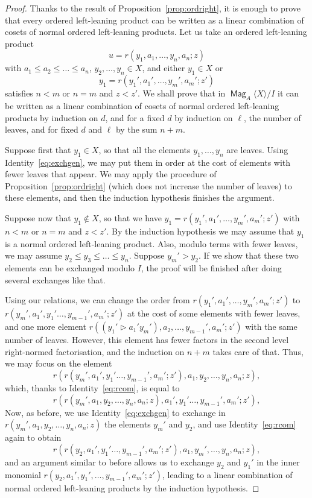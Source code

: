 \documentclass[10pt,a4paper]{article}
\theoremstyle{definition}
\numberwithin{equation}{section}
\numberwithin{figure}{section}
\DeclareMathOperator{\Mag}{\mathsf{Mag}}
\begin{document}
\begin{proof}
Thanks to the result of Proposition~\ref{prop:ordright}, it is enough to prove that every ordered left-leaning product can be written as a linear combination of cosets of normal ordered left-leaning products. Let us take an ordered left-leaning product
\[
u=r(y_1,a_1,\dots,y_n,a_n;z)
\]
with $a_1\le a_2\le\dots\le a_n$, $y_2,\dots,y_n\in X$, and either $y_{1}\in X$ or
\[
y_{1}=
r\left(y_1',a_1',\dots,y_m',a_m';z'\right)
\]
satisfies $n<m$ or $n=m$ and $z<z'$. We shall prove that in $\Mag_A\langle X\rangle/I$ it can be written as a linear combination of cosets of normal ordered left-leaning products by induction on $d$, and for a fixed $d$ by induction on $\ell$, the number of leaves, and for fixed $d$ and $\ell$ by the sum $n+m$.

Suppose first that $y_{1}\in X$, so that all the elements $y_1,\dots,y_{n}$ are leaves. Using Identity~\eqref{eq:exchgen}, we may put them in order at the cost of elements with fewer leaves that appear. We may apply the procedure of Proposition~\ref{prop:ordright} (which does not increase the number of leaves) to these elements, and then the induction hypothesis finishes the argument.

Suppose now that $y_1\notin X$, so that we have $y_{1}=r(y_1',a_1',\dots,y_m',a_m';z')$ with $n<m$ or $n=m$ and $z<z'$. By the induction hypothesis we may assume that $y_{1}$ is a normal ordered left-leaning product. Also, modulo terms with fewer leaves, we may assume $y_2\le y_3\le\dots\le y_n$. Suppose $y_m'> y_2$. If we show that these two elements can be exchanged modulo $I$, the proof will be finished after doing several exchanges like that.

Using our relations, we can change the order from $r(y_1',a_1',\dots,y_m',a_m';z')$ to $r(y_m',a_1',y_1'\dots,y_{m-1}',a_m';z')$ at the cost of some elements with fewer leaves, and one more element $r((y_1'\triangleright a_1' y_m'),a_2,\dots,y_{m-1}',a_m';z')$ with the same number of leaves. However, this element has fewer factors in the second level right-normed factorisation, and the induction on $n+m$ takes care of that. Thus, we may focus on the element
\[
r\left(r(y_m',a_1',y_1'\dots,y_{m-1}',a_m';z'),a_1,y_2,\dots,y_n,a_n;z\right),
\]
which, thanks to Identity~\eqref{eq:rcom}, is equal to
\[
r\left(r(y_m',a_1,y_2,\dots,y_n,a_n;z),a_1',y_1'\dots,y_{m-1}',a_m';z'
\right),
\]
Now, as before, we use Identity~\eqref{eq:exchgen} to exchange in $r(y_m',a_1,y_2,\dots,y_n,a_n;z)$ the elements $y_m'$ and $y_2$, and use Identity~\eqref{eq:rcom} again to obtain
\[
r\left(r(y_2,a_1',y_1'\dots,y_{m-1}',a_m';z'),a_1,y_m',\dots,y_n,a_n;z
\right),
\]
and an argument similar to before allows us to exchange $y_2$ and $y_{1}'$ in the inner monomial $r(y_2,a_1',y_1',\dots,y_{m-1}',a_m';z')$, leading to a linear combination of normal ordered left-leaning products by the induction hypothesis.
\end{proof}
\end{document}
